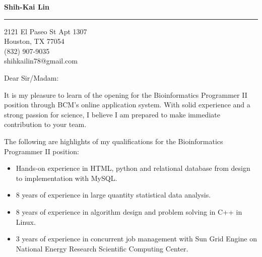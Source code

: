 \documentclass{letter} %
\begin{document}
\signature{Shih-Kai Lin}           %
\longindentation=0pt                       %
\let\raggedleft\raggedright                %
 
 
\begin{letter}{}

\begin{center}
{\large\bf Shih-Kai Lin} 
\end{center}
\medskip\hrule height 1pt
\begin{center}
{2121 El Paseo St Apt 1307 \\   Houston, TX 77054 \\ (832) 907-9035 \\ shihkailin78@gmail.com} 
\end{center} \vfill %
 
 
\opening{Dear Sir/Madam:} 
 
\noindent %
It is my pleasure to learn of the opening for the Bioinformatics Programmer II position through BCM's online application system. With solid experience and a strong passion for science, I believe I am prepared to make immediate contribution to your team.
 
\noindent %
The following are highlights of my qualifications for the Bioinformatics Programmer II position:
\begin{itemize}
  \item Hands-on experience in HTML, python and relational database from design to implementation with MySQL.
	\item 8 years of experience in large quantity statistical data analysis.
	\item 8 years of experience in algorithm design and problem solving in C++ in Linux.
	\item 3 years of experience in concurrent job management with Sun Grid Engine on National Energy Research Scientific Computing Center.
\end{itemize}


\end{letter}
\end{document}
